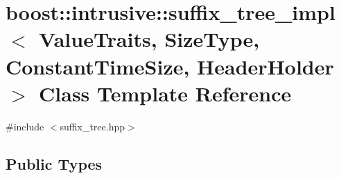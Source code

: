 \hypertarget{classboost_1_1intrusive_1_1suffix__tree__impl}{}\section{boost\+:\+:intrusive\+:\+:suffix\+\_\+tree\+\_\+impl$<$ Value\+Traits, Size\+Type, Constant\+Time\+Size, Header\+Holder $>$ Class Template Reference}
\label{classboost_1_1intrusive_1_1suffix__tree__impl}


{\ttfamily \#include $<$suffix\+\_\+tree.\+hpp$>$}

\subsection*{Public Types}
